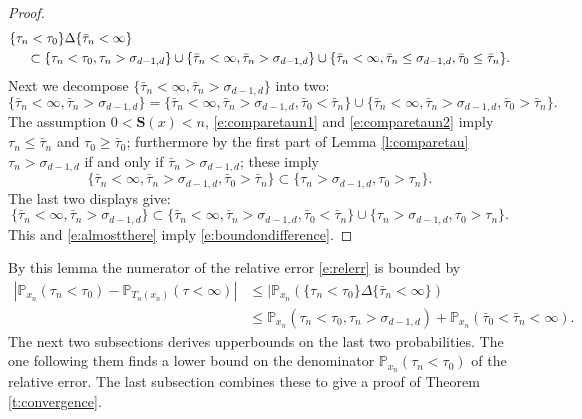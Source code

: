 \documentclass[11pt,a4paper]{article}
\begin{document}
\begin{proof}
\begin{align}
&\{\tau_n < \tau_0\}  \Delta \{ \bar\tau_n < \infty\}\\
&~~~~\subset \{ \tau_n < \tau_0,  \tau_n >\sigma_{d-1,d} \}
\cup \{ \bar\tau_n < \infty,  \bar\tau_n > \sigma_{d-1,d} \}
\cup \{ \bar\tau_n < \infty ,  \bar\tau_n \le \sigma_{d-1,d}, \bar\tau_0 \le \bar\tau_n \}.\notag
\end{align}
Next we decompose  $\{ \bar\tau_n < \infty,  \bar\tau_n > \sigma_{d-1,d} \}$
into two:
\[
\{ \bar\tau_n < \infty,  \bar\tau_n > \sigma_{d-1,d} \}
=
\{ \bar\tau_n < \infty,  \bar\tau_n > \sigma_{d-1,d} , \bar\tau_0 < \bar\tau_n \} \cup
\{ \bar\tau_n < \infty,  \bar\tau_n > \sigma_{d-1,d} , \bar\tau_0 >
\bar\tau_n \}.
\]
The assumption $ 0 < {\bm S}(x) < n$, \eqref{e:comparetaun1} and
\eqref{e:comparetaun2} imply 
$\tau_n \le \bar\tau_n$ and $\tau_0 \ge \bar\tau_0$; furthermore by
the first part of Lemma \ref{l:comparetau}
$\tau_n > \sigma_{d-1,d}$ if and only if $\bar\tau_n  > \sigma_{d-1,d}$;
these imply
\[
\{ \bar\tau_n < \infty,  \bar\tau_n > \sigma_{d-1,d} , \bar\tau_0 > \bar\tau_n\}
\subset
\{ \tau_n > \sigma_{d-1,d} , \tau_0 >\tau_n\}.
\]
The last two displays give:
\[
\{ \bar\tau_n < \infty,  \bar\tau_n > \sigma_{d-1,d} \}
\subset
\{ \bar\tau_n < \infty,  \bar\tau_n > \sigma_{d-1,d} , \bar\tau_0 < \bar\tau_n \} \cup
\{ \tau_n > \sigma_{d-1,d} , \tau_0 >\tau_n\}.
\]
This and \eqref{e:almostthere} imply \eqref{e:boundondifference}.
\end{proof}
By this lemma the numerator of the relative error \eqref{e:relerr}
is bounded by
\begin{align*}
| {\mathbb P}_{x_n}(\tau_n < \tau_0 ) - {\mathbb P}_{T_n(x_n)}(\tau < \infty) | &\le 
| {\mathbb P}_{x_n}( \{\tau_n < \tau_0 \} \Delta \{\bar\tau_n < \infty\}) \\
&\le 
{\mathbb P}_{x_n}( \tau_n < \tau_0,  \tau_n >\sigma_{d-1,d} )
+{\mathbb P}_{x_n}(\bar\tau_0  < \bar\tau_n < \infty).
\end{align*}
The next two subsections derives upperbounds on the last two probabilities.
The one following them finds a lower bound on the denominator 
${\mathbb P}_{x_n}(\tau_n < \tau_0)$ of the relative error. The last
subsection combines these to give a proof of Theorem \ref{t:convergence}.
\end{document}
